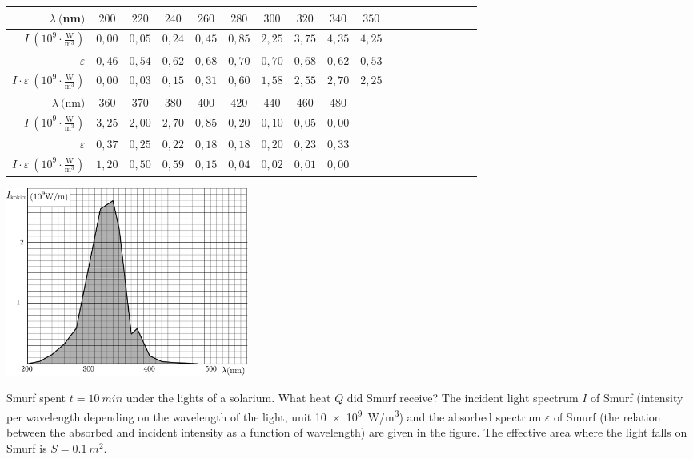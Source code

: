 {\begin{tabular}{r|c|c|c|c|c|c|c|c|c|c|c|c|c|c|c|c|c|}
	\hline
	$ \lambda \ ($nm$) $&$ 200 $&$ 220 $&$ 240 $&$ 260 $&$ 280 $&$ 300 $&$ 320 $&$ 340 $&$ 350 $\\
	\hline
	$ I \ (10^9 \cdot \frac{\text{W}}{\text{m}^3}) $&$ 0,00 $&$ 0,05 $&$ 0,24 $&$ 0,45 $&$ 0,85 $&$ 2,25 $&$ 3,75 $&$ 4,35 $&$ 4,25 $\\
	\hline
	$ \varepsilon $&$ 0,46 $&$ 0,54 $&$ 0,62 $&$ 0,68 $&$ 0,70 $&$ 0,70 $&$ 0,68 $&$ 0,62 $&$ 0,53 $\\
	\hline
	$ I \cdot \varepsilon \ (10^9 \cdot \frac{\text{W}}{\text{m}^3}) $&$ 0,00 $&$ 0,03 $&$ 0,15 $&$ 0,31 $&$ 0,60 $&$ 1,58 $&$ 2,55 $&$ 2,70 $&$ 2,25 $\\
	\hline
	\hline
	$ \lambda \ ($nm$) $&$ 360 $&$ 370 $&$ 380 $&$ 400 $&$ 420 $&$ 440 $&$ 460 $&$ 480 $\\
	\hline
	$ I \ (10^9 \cdot \frac{\text{W}}{\text{m}^3}) $&$ 3,25 $&$ 2,00 $&$ 2,70 $&$ 0,85 $&$ 0,20 $&$ 0,10 $&$ 0,05 $&$ 0,00 $\\
	\hline
	$ \varepsilon $&$ 0,37 $&$ 0,25 $&$ 0,22 $&$ 0,18 $&$ 0,18 $&$ 0,20 $&$ 0,23 $&$ 0,33 $\\
	\hline
	$ I \cdot \varepsilon \ (10^9 \cdot \frac{\text{W}}{\text{m}^3}) $&$ 1,20 $&$ 0,50 $&$ 0,59 $&$ 0,15 $&$ 0,04 $&$ 0,02 $&$ 0,01 $&$ 0,00 $\\ 	
\end{tabular}

\begin{center}
	\includegraphics[width=80mm]{2011-lahg-04-intensity}
\end{center}
\fi


\ifEngStatement
Smurf spent $t = \SI{10}{min} $ under the lights of a solarium. What heat $ Q $ did Smurf receive? The incident light spectrum $I$ of Smurf (intensity per wavelength depending on the wavelength of the light, unit \SI{10e9}{W/m^3}) and the absorbed spectrum $\varepsilon$ of Smurf (the relation between the absorbed and incident intensity as a function of wavelength) are given in the figure. The effective area where the light falls on Smurf is $ S = \SI{0,1}{m^2} $.

}

